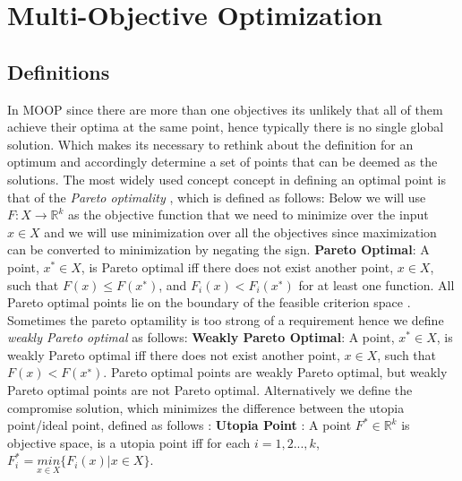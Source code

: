 \section{Multi-Objective Optimization}
\subsection{Definitions}
In MOOP since there are more than one objectives its unlikely that all of them achieve their optima at the same point, hence typically there is no single global solution. Which makes its necessary to rethink about the definition for an optimum and accordingly determine a set of points that can be deemed as the solutions. The most widely used concept concept in defining an optimal point is that of the \textit{Pareto optimality} \cite{pareto1971manual}, which is defined as follows:\newline 
Below we will use $F: X \to \mathbb{R}^k$ as the objective function that we need to minimize over the input $x\in X$ and we will use minimization over all the objectives since maximization can be converted to minimization by negating the sign.\newline\newline
\textbf{Pareto Optimal}: A point, $x^{*} \in X$, is
Pareto optimal iff there does not exist another point, $x \in X$, such that $F(x) \le F(x^{∗})$, and $F_i(x)<F_i(x^{∗})$ for at least one function. 
\newline\newline
All Pareto optimal points lie on the boundary of the feasible criterion space \cite{Athan1996-cm}. Sometimes the pareto optamility is too strong of a requirement hence we define \textit{weakly Pareto optimal} as follows:\newline\newline
\textbf{Weakly Pareto Optimal}: A point, $x^{*} \in X$, is weakly Pareto optimal iff there does not exist another point, $x \in X$, such that $F(x) < F(x^{∗})$.\newline\newline
Pareto optimal points are weakly Pareto optimal, but weakly Pareto optimal points are not Pareto optimal.\newline
Alternatively we define the compromise solution, which minimizes the difference between the utopia point/ideal point, defined as follows \cite{vincent1981optimality}:\newline\newline
\textbf{Utopia Point} \label{ideal_point_def}: A point $F^{*} \in \mathbb{R}^k$ is objective space, is a utopia point iff for each $i = 1, 2 ... ,k$, $F^{*}_i = \underset{x \in X}{min} \{ F_i(x)|x \in X\}$.\newline\newline
